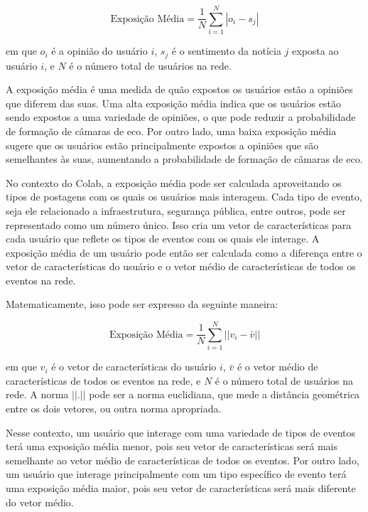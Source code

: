 \begin{equation}
	\text{{Exposição Média}} = \frac{1}{N} \sum_{i=1}^{N} |o_i - s_j|
\end{equation}

em que $o_i$ é a opinião do usuário $i$, $s_j$ é o sentimento da notícia $j$ exposta ao usuário $i$, e $N$ é o número total de usuários na rede.

A exposição média é uma medida de quão expostos os usuários estão a opiniões que diferem das suas. Uma alta exposição média indica que os usuários estão sendo expostos a uma variedade de opiniões, o que pode reduzir a probabilidade de formação de câmaras de eco. Por outro lado, uma baixa exposição média sugere que os usuários estão principalmente expostos a opiniões que são semelhantes às suas, aumentando a probabilidade de formação de câmaras de eco.

No contexto do Colab, a exposição média pode ser calculada aproveitando os tipos de postagens com os quais os usuários mais interagem. Cada tipo de evento, seja ele relacionado a infraestrutura, segurança pública, entre outros, pode ser representado como um número único. Isso cria um vetor de características para cada usuário que reflete os tipos de eventos com os quais ele interage. A exposição média de um usuário pode então ser calculada como a diferença entre o vetor de características do usuário e o vetor médio de características de todos os eventos na rede.

Matematicamente, isso pode ser expresso da seguinte maneira:

\begin{equation}
	\text{{Exposição Média}} = \frac{1}{N} \sum_{i=1}^{N} ||v_i - \bar{v}||
\end{equation}

em que $v_i$ é o vetor de características do usuário $i$, $\bar{v}$ é o vetor médio de características de todos os eventos na rede, e $N$ é o número total de usuários na rede. A norma $||.||$ pode ser a norma euclidiana, que mede a distância geométrica entre os dois vetores, ou outra norma apropriada.

Nesse contexto, um usuário que interage com uma variedade de tipos de eventos terá uma exposição média menor, pois seu vetor de características será mais semelhante ao vetor médio de características de todos os eventos. Por outro lado, um usuário que interage principalmente com um tipo específico de evento terá uma exposição média maior, pois seu vetor de características será mais diferente do vetor médio.

